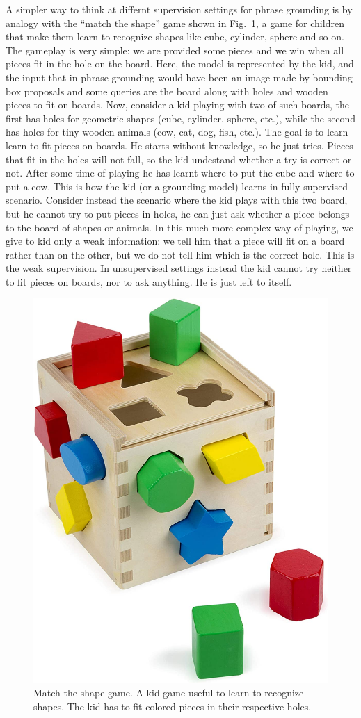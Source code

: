 A simpler way to think at differnt supervision settings for phrase
grounding is by analogy with the ``match the shape'' game shown in
Fig.~\ref{fig:match-the-shape-game}, a game for children that make
them learn to recognize shapes like cube, cylinder, sphere and so on.
The gameplay is very simple: we are provided some pieces and we win
when all pieces fit in the hole on the board. Here, the model is
represented by the kid, and the input that in phrase grounding would
have been an image made by bounding box proposals and some queries are
the board along with holes and wooden pieces to fit on boards. Now,
consider a kid playing with two of such boards, the first has holes
for geometric shapes (cube, cylinder, sphere, etc.), while the second
has holes for tiny wooden animals (cow, cat, dog, fish, etc.). The
goal is to learn learn to fit pieces on boards. He starts without
knowledge, so he just tries. Pieces that fit in the holes will not
fall, so the kid undestand whether a try is correct or not. After some
time of playing he has learnt where to put the cube and where to put a
cow. This is how the kid (or a grounding model) learns in fully
supervised scenario. Consider instead the scenario where the kid plays
with this two board, but he cannot try to put pieces in holes, he can
just ask whether a piece belongs to the board of shapes or animals. In
this much more complex way of playing, we give to kid only a weak
information: we tell him that a piece will fit on a board rather than
on the other, but we do not tell him which is the correct hole. This
is the weak supervision. In unsupervised settings instead the kid
cannot try neither to fit pieces on boards, nor to ask anything. He is
just left to itself.

\begin{figure}[H]
  \centering
  \includegraphics[width=.4\textwidth]{figures/match-shapes-game.jpg}
  \caption[Match the shape game]{
    Match the shape game. A kid game useful to learn to recognize
    shapes. The kid has to fit colored pieces in their respective
    holes.
  }
  \label{fig:match-the-shape-game}
\end{figure}

